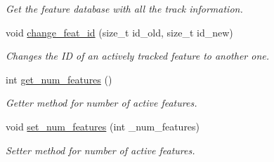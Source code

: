 \begin{DoxyCompactItemize}
$$\begin{DoxyCompactList}\small\item\em Get the feature database with all the track information. \end{DoxyCompactList}\item 
void \hyperlink{classov__core_1_1TrackBase_a8f4f7f1c4de3c33a254c14b1f96af5a0}{change\+\_\+feat\+\_\+id} (size\+\_\+t id\+\_\+old, size\+\_\+t id\+\_\+new)
\begin{DoxyCompactList}\small\item\em Changes the ID of an actively tracked feature to another one. \end{DoxyCompactList}\item 
\mbox{\label{classov__core_1_1TrackBase_a35238206253104bd568d1321dd767610}} 
int \hyperlink{classov__core_1_1TrackBase_a35238206253104bd568d1321dd767610}{get\+\_\+num\+\_\+features} ()
\begin{DoxyCompactList}\small\item\em Getter method for number of active features. \end{DoxyCompactList}\item 
\mbox{\label{classov__core_1_1TrackBase_a91d20228c100c753217043e7ebb5f99e}} 
void \hyperlink{classov__core_1_1TrackBase_a91d20228c100c753217043e7ebb5f99e}{set\+\_\+num\+\_\+features} (int \+\_\+num\+\_\+features)
\begin{DoxyCompactList}\small\item\em Setter method for number of active features. \end{DoxyCompactList}\end{DoxyCompactItemize}
